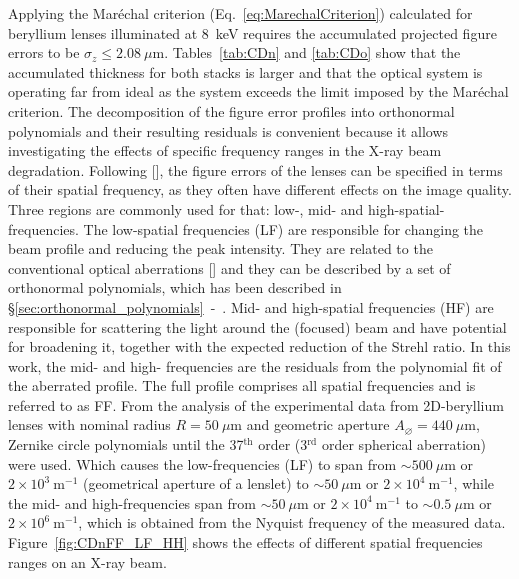 \begin{refsection}
Applying the Mar\'echal criterion (Eq.~\ref{eq:MarechalCriterion}) calculated for beryllium lenses illuminated at 8~keV requires the accumulated projected figure errors to be $\sigma_z\leq2.08~\mu\text{m}$. Tables~\ref{tab:CDn} and \ref{tab:CDo} show that the accumulated thickness for both stacks is larger and that the optical system is operating far from ideal as the system exceeds the limit imposed by the Mar\'echal criterion. The decomposition of the figure error profiles into orthonormal polynomials and their resulting residuals is convenient because it allows investigating the effects of specific frequency ranges in the X-ray beam degradation. Following [\cite{Harvey1995a}], the figure errors of the lenses can be specified in terms of their spatial frequency, as they often have different effects on the image quality. Three regions are commonly used for that: low-, mid- and high-spatial-frequencies. The low-spatial frequencies (LF) are responsible for changing the beam profile and reducing the peak intensity. They are related to the conventional optical aberrations [\cite[\textit{\S9.1-3}]{born_wolf1999}] and they can be described by a set of orthonormal polynomials, which has been described in \S\ref{sec:orthonormal_polynomials}~-~\textit{}. Mid- and high-spatial frequencies (HF) are responsible for scattering the light around the (focused) beam and have potential for broadening it, together with the expected reduction of the Strehl ratio. In this work, the mid- and high- frequencies are the residuals from the polynomial fit of the aberrated profile. The full profile comprises all spatial frequencies and is referred to as FF. From the analysis of the experimental data from 2D-beryllium lenses with nominal radius $R=50~\mu\text{m}$ and geometric aperture $A_{\diameter}=440~\mu\text{m}$, Zernike circle polynomials until the 37$^\text{th}$ order (3$^\text{rd}$ order spherical aberration) were used. Which causes the low-frequencies (LF) to span from $\sim500~\mu$m or $2\times10^{3}~\text{m}^{-1}$ (geometrical aperture of a lenslet) to $\sim50~\mu$m or $2\times10^{4}~\text{m}^{-1}$, while the mid- and high-frequencies span from $\sim50~\mu$m or $2\times10^{4}~\text{m}^{-1}$ to $\sim0.5~\mu$m or $2\times10^{6}~\text{m}^{-1}$, which is obtained from the Nyquist frequency of the measured data. Figure~\ref{fig:CDnFF_LF_HH} shows the effects of different spatial frequencies ranges on an X-ray beam. 


\end{refsection}
